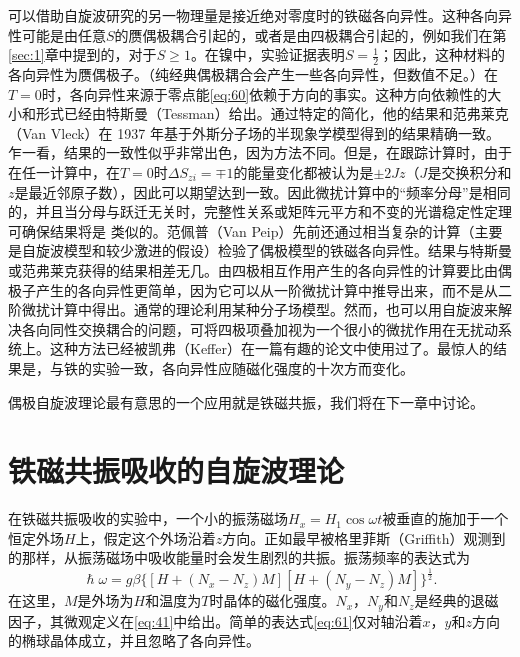 \documentclass{article}
\begin{document}
可以借助自旋波研究的另一物理量是接近绝对零度时的铁磁各向异性。这种各向异性可能是由任意$S$的赝偶极耦合引起的，或者是由四极耦合引起的，例如我们在第\ref{sec:1}章中提到的，对于$S\geqslant 1$。在镍中，实验证据表明$S=\tfrac{1}{2}$；因此，这种材料的各向异性为赝偶极子。（纯经典偶极耦合会产生一些各向异性，但数值不足。）在$T=0$时，各向异性来源于零点能\eqref{eq:60}依赖于方向的事实。这种方向依赖性的大小和形式已经由特斯曼（Tessman）给出。通过特定的简化，他的结果和范弗莱克（Van Vleck）在 1937 年基于外斯分子场的半现象学模型得到的结果精确一致。乍一看，结果的一致性似乎非常出色，因为方法不同。但是，在跟踪计算时，由于在任一计算中，在$T=0$时$\Delta S_{zi}=\mp 1$的能量变化都被认为是$\pm 2Jz$（$J$是交换积分和$z$是最近邻原子数），因此可以期望达到一致。因此微扰计算中的“频率分母”是相同的，并且当分母与跃迁无关时，完整性关系或矩阵元平方和不变的光谱稳定性定理可确保结果将是 类似的。范佩普（Van Peip）先前还通过相当复杂的计算（主要是自旋波模型和较少激进的假设）检验了偶极模型的铁磁各向异性。结果与特斯曼或范弗莱克获得的结果相差无几。由四极相互作用产生的各向异性的计算要比由偶极子产生的各向异性更简单，因为它可以从一阶微扰计算中推导出来，而不是从二阶微扰计算中得出。通常的理论利用某种分子场模型。然而，也可以用自旋波来解决各向同性交换耦合的问题，可将四极项叠加视为一个很小的微扰作用在无扰动系统上。这种方法已经被凯弗（Keffer）在一篇有趣的论文中使用过了。最惊人的结果是，与铁的实验一致，各向异性应随磁化强度的十次方而变化。

偶极自旋波理论最有意思的一个应用就是铁磁共振，我们将在下一章中讨论。




\section{铁磁共振吸收的自旋波理论} \label{sec:6}

在铁磁共振吸收的实验中，一个小的振荡磁场$H_x=H_1\cos\omega t$被垂直的施加于一个恒定外场$H$上，假定这个外场沿着$z$方向。正如最早被格里菲斯（Griffith）观测到的那样，从振荡磁场中吸收能量时会发生剧烈的共振。振荡频率的表达式为
\begin{equation} \label{eq:61}
\hslash\omega=g\beta\{[H+(N_x-N_z)M][H+(N_y-N_z)M]\}^{\frac{1}{2}}.
\end{equation}
在这里，$M$是外场为$H$和温度为$T$时晶体的磁化强度。$N_x$，$N_y$和$N_z$是经典的退磁因子，其微观定义在\eqref{eq:41}中给出。简单的表达式\eqref{eq:61}仅对轴沿着$x$，$y$和$z$方向的椭球晶体成立，并且忽略了各向异性。
\end{document}
